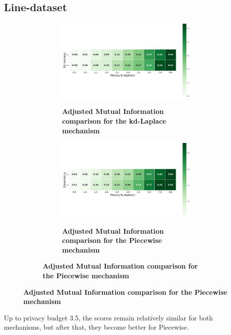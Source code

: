 {{\newpage
\subsection{Line-dataset}
\begin{figure}[H]
  \centering
  \begin{subfigure}[b]{0.85\textwidth}
    \begin{subfigure}[c]{1\textwidth}
      \caption{\textbf{Adjusted Mutual Information comparison for the kd-Laplace mechanism}}
      \includegraphics[width=1\textwidth]{Results/nd-laplace/nd-Laplace/line-dataset/ami.png}
      \label{fig:ami_line-dataset_comparison_kdlaplace_2d}
    \end{subfigure}
    \vfill %
    \begin{subfigure}[c]{1\textwidth}
      \caption{\textbf{Adjusted Mutual Information comparison for the Piecewise mechanism}}
      \includegraphics[width=1\textwidth]{Results/nd-laplace/piecewise/line-dataset/ami.png}
      \label{fig:ami_line-dataset_comparison_piecewise_2d}
    \end{subfigure}
  \end{subfigure}
\end{figure}
Up to privacy budget 3.5, the scores remain relatively similar for both mechanisms, but after that, they become better for Piecewise.

}}
